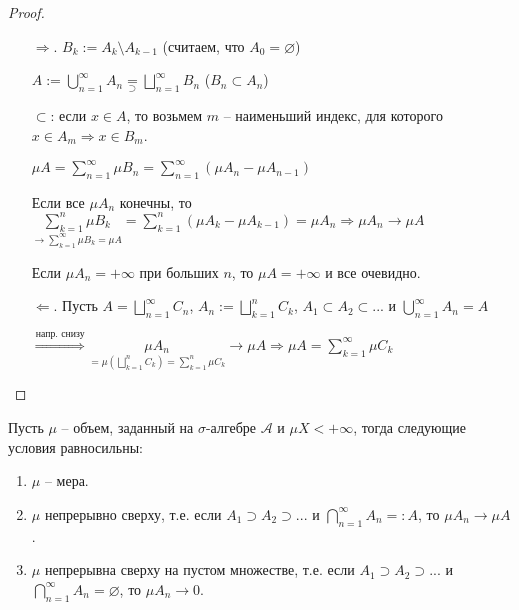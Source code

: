\begin{proof}~
    \begin{enumerate}
        \item[$\Rightarrow$.] $B_k := A_k \setminus A_{k-1}$ (считаем, что $A_0=\varnothing$)
        
        $A:=\bigcup\limits_{n=1}^\infty A_n \underset{\supset}{=} \bigsqcup\limits_{n=1}^\infty B_n$ ($B_n \subset A_n$)

        $\subset$: если $x\in A$, то возьмем $m$ – наименьший индекс, для которого $x\in A_m\Rightarrow x\in B_m$.

        $\mu A= \sum \limits_{n=1}^\infty \mu B_n = \sum \limits_{n=1}^\infty(\mu A_n - \mu A_{n-1})$

        Если все $\mu A_n$ конечны, то $\underset{\rightarrow \sum \limits_{k=1}^\infty \mu B_k=\mu A}{\sum \limits_{k=1}^n \mu B_k} = \sum \limits_{k=1}^n (\mu A_k - \mu A_{k-1})=\mu A_n\Rightarrow \mu A_n\rightarrow \mu A$

        Если $\mu A_n=+\infty$ при больших $n$, то $\mu A=+\infty$ и все очевидно.

        \item[$\Leftarrow$.] Пусть $A=\bigsqcup \limits_{n=1}^\infty C_n$, $A_n:=\bigsqcup \limits_{k=1}^n C_k$, $A_1\subset A_2 \subset ...$ и $\bigcup\limits_{n=1}^\infty A_n = A$
        
        $\overset{\text{напр. снизу}}{\Rightarrow}\underset{=\mu (\bigsqcup\limits_{k=1}^n C_k)=\sum\limits_{k=1}^n\mu C_k}{\mu A_n}\rightarrow \mu A
        \Rightarrow \mu A = \sum\limits_{k=1}^\infty \mu C_k$
    \end{enumerate}
\end{proof}

\begin{theorem}
    Пусть $\mu$ –  объем, заданный на $\sigma$-алгебре $\mathcal{A}$ и $\mu X< +\infty$, 
    тогда следующие условия равносильны:
    \begin{enumerate}
        \item $\mu$ – мера.
        \item $\mu$ непрерывно сверху, т.е. если $A_1 \supset A_2 \supset ...$ и $\bigcap\limits_{n=1}^\infty A_n = :A$, 
        то $\mu A_n \rightarrow \mu A$.
        \item $\mu$ непрерывна сверху на пустом множестве, т.е. если $A_1 \supset A_2 \supset ...$ и $\bigcap\limits_{n=1}^\infty A_n = \varnothing$, то $\mu A_n \rightarrow 0$.
    \end{enumerate}
\end{theorem}

